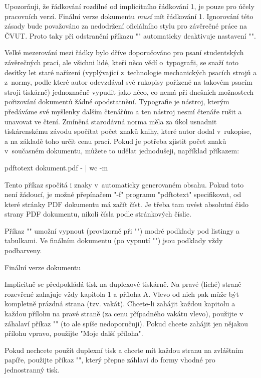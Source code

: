 Upozorňuji, že řádkování rozdílné od implicitního řádkování 1, je pouze pro
účely pracovních verzí. Finální verze dokumentu {\em musí} mít řádkování 1. 
Ignorování této zásady bude považováno za nedodržení oficiálního
stylu pro závěrečné práce na ČVUT. Proto taky \ctustyle{} při odstranění příkazu
"\draft" automaticky deaktivuje nastavení "\linespacing".

Velké mezerování mezi řádky bylo dříve
doporučováno pro psaní studentských závěrečných prací, ale všichni lidé, kteří
něco vědí o~typografii, se snaží toto desítky let staré nařízení (vyplývající
z~technologie mechanických psacích strojů a z~normy, podle které autor
odevzdával své rukopisy pořízené na takovém psacím stroji tiskárně) jednoznačně vypudit
jako něco, co nemá při dnešních možnostech pořizování dokumentů žádné
opodstatnění. Typografie je nástroj, kterým předáváme své myšlenky dalším
čtenářům a ten nástroj nesmí čtenáře rušit a unavovat ve čtení.
%
Zmíněná starodávná norma měla za úkol usnadnit tiskárenskému závodu
spočítat počet znaků knihy, které autor dodal v~rukopise, a na základě toho
určit cenu prací. Pokud je potřeba zjistit počet znaků v~současném dokumentu, 
můžete to udělat jednodušeji, například příkazem:

\begtt
pdftotext dokument.pdf - | wc -m
\endtt

Tento příkaz spočítá i znaky v~automaticky generovaném obsahu. Pokud toto
není žádoucí, je možné přepínačem "-f" programu "pdftotext" specifikovat, od
které stránky PDF dokumentu má začít číst. Je třeba tam uvést absolutní číslo
strany PDF dokumentu, nikoli čísla podle stránkových číslic.

Příkaz "\savetoner" umožní vypnout (provizorně při "\draft") modré podklady
pod listingy a tabulkami. Ve finálním dokumentu (po vypnutí "\draft") 
jsou podklady vždy podbarveny.

\sec Finální verze dokumentu

Implicitně se předpokládá tisk na duplexové tiskárně.
Na pravé (liché) straně rozevřené  zahajuje vždy kapitola 1 a
příloha A. Vlevo od nich pak může být kompletně prázdná strana (tzv. vakát).
Chcete-li zahájit každou kapitolu a každou přílohu na pravé straně
(za cenu případného vakátu vlevo), použijte v záhalaví příkaz "\oddchapters"
(to ale spíše nedoporučuji). Pokud chcete zahájit jen nějakou přílohu vpravo, použijte
"\nextoddpage \app Moje další příloha".

Pokud nechcete použít duplexní tisk a chcete mít každou stranu na
zvláštním papíře, použijte příkaz "\onesideprinting", který přepne záhlaví do
formy vhodné pro jednostranný tisk.

